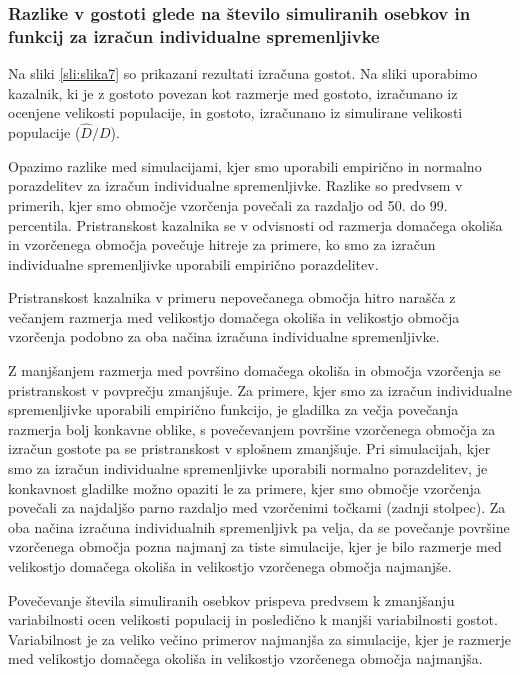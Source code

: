\subsubsection[\bfseries Razlike v gostoti glede na število simuliranih osebkov in funkcij za izračun individualne spremenljivke]{Razlike v gostoti glede na število simuliranih osebkov in funkcij za izračun individualne spremenljivke}
Na sliki \ref{sli:slika7} so prikazani rezultati izračuna gostot. Na sliki uporabimo kazalnik, ki je z gostoto povezan kot razmerje med gostoto, izračunano iz ocenjene velikosti populacije, in gostoto, izračunano iz simulirane velikosti populacije ($\hat{D}/D$).

Opazimo razlike med simulacijami, kjer smo uporabili empirično in normalno porazdelitev za izračun individualne spremenljivke. Razlike so predvsem v primerih, kjer smo območje vzorčenja povečali za razdaljo od 50. do 99. percentila. Pristranskost kazalnika se v odvisnosti od razmerja domačega okoliša in vzorčenega območja povečuje hitreje za primere, ko smo za izračun individualne spremenljivke uporabili empirično porazdelitev.

Pristranskost kazalnika v primeru nepovečanega območja hitro narašča z večanjem razmerja med velikostjo domačega okoliša in velikostjo območja vzorčenja podobno za oba načina izračuna individualne spremenljivke.

Z manjšanjem razmerja med površino domačega okoliša in območja vzorčenja se pristranskost v povprečju zmanjšuje. Za primere, kjer smo za izračun individualne spremenljivke uporabili empirično funkcijo, je gladilka za večja povečanja razmerja bolj konkavne oblike, s povečevanjem površine vzorčenega območja za izračun gostote pa se pristranskost v splošnem zmanjšuje.
Pri simulacijah, kjer smo za izračun individualne spremenljivke uporabili normalno porazdelitev, je konkavnost gladilke možno opaziti le za primere, kjer smo območje vzorčenja povečali za najdaljšo parno razdaljo med vzorčenimi točkami (zadnji stolpec).
Za oba načina izračuna individualnih spremenljivk pa velja, da se povečanje površine vzorčenega območja pozna najmanj za tiste simulacije, kjer je bilo razmerje med velikostjo domačega okoliša in velikostjo vzorčenega območja najmanjše.

Povečevanje števila simuliranih osebkov prispeva predvsem k zmanjšanju variabilnosti ocen velikosti populacij in posledično k manjši variabilnosti gostot. Variabilnost je za veliko večino primerov najmanjša za simulacije, kjer je razmerje med velikostjo domačega okoliša in velikostjo vzorčenega območja najmanjša.

